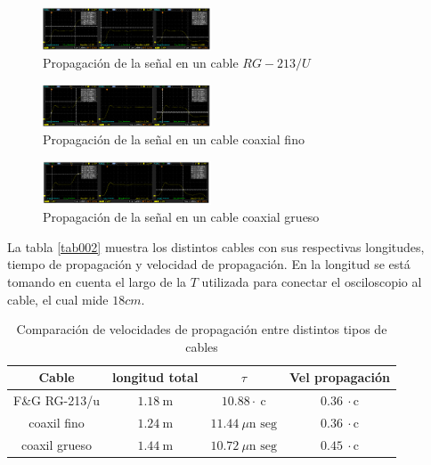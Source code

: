 \documentclass[a4paper,10pt]{article}
\begin{document}
		\begin{figure}[!htb]
			\centering
			\includegraphics[width=5cm]
			{Imagenes/CableF&G.png}
			\caption{Propagación de la señal en un cable $RG-213/U$}
			\label{img010}
		\end{figure}
		\begin{figure}[!htb]
			\centering
			\includegraphics[width=5cm]
			{Imagenes/CableCoaxialFino.png}
			\caption{Propagación de la señal en un cable coaxial fino}
			\label{img011}
		\end{figure}
		\begin{figure}[!htb]
			\centering
			\includegraphics[width=5cm]
			{Imagenes/CableCoaxialGrueso.png}
			\caption{Propagación de la señal en un cable coaxial grueso}
			\label{img012}
		\end{figure}

	\indent La tabla \ref{tab002} muestra los distintos cables con sus 
	respectivas longitudes, tiempo de propagación y velocidad de propagación. En
	la longitud se está tomando en cuenta el largo de la $T$ utilizada para 
	conectar el osciloscopio al cable, el cual mide $18 cm$. \\
	
	\begin{table}[!htp]
		\centering
		\begin{tabular}{|c|c|c|c|}
			\hline
    		Cable & longitud total & $\tau$ & Vel propagación \\
			\hline
			F\&G RG-213/u & $1.18~\text{m}$ & $10.88\cdot~\text{c}$ & 
			$0.36~\cdot\text{c}$ \\
			\hline 
			coaxil fino & $1.24~\text{m}$ & $11.44~\mu\text{n seg}$ &
			$0.36~\cdot\text{c}$ \\
			\hline
			coaxil grueso & $1.44~\text{m}$ & $10.72~\mu\text{n seg}$ & 
			$0.45~\cdot\text{c}$ \\
			\hline
		\end{tabular}
		\caption{Comparación de velocidades de propagación entre distintos 
		tipos de cables} \label{tab001}
	\end{table}
\end{document}
